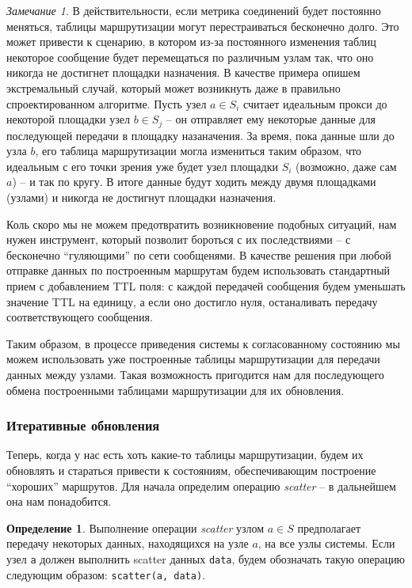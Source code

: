 \documentclass{article}
\theoremstyle{plain}
\theoremstyle{plain}
\theoremstyle{plain}
\theoremstyle{plain}
\theoremstyle{definition}
\newtheorem{definition}{Определение}[section]
\theoremstyle{remark}
\newtheorem{remark}{Замечание}[section]
\theoremstyle{plain}
\begin{document}
\begin{remark}
\label{InfinityLoops}
    В действительности, если метрика соединений будет постоянно меняться, таблицы маршрутизации могут перестраиваться бесконечно долго. Это может привести к сценарию, в котором из-за постоянного изменения таблиц некоторое сообщение будет перемещаться по различным узлам так, что оно никогда не достигнет площадки назначения. В качестве примера опишем экстремальный случай, который может возникнуть даже в правильно спроектированном алгоритме. Пусть узел $a \in S_i$ считает идеальным прокси до некоторой площадки узел $b \in S_j$ -- он отправляет ему некоторые данные для последующей передачи в площадку назаначения. За время, пока данные шли до узла $b$, его таблица маршрутизации могла измениться таким образом, что идеальным с его точки зрения уже будет узел площадки $S_i$ (возможно, даже сам $a$) -- и так по кругу. В итоге данные будут ходить между двумя площадками (узлами) и никогда не достигнут площадки назначения.
    
    Коль скоро мы не можем предотвратить возникновение подобных ситуаций, нам нужен инструмент, который позволит бороться с их последствиями -- с бесконечно \enquote{гуляющими} по сети сообщенями. В качестве решения при любой отправке данных по построенным маршрутам будем использовать стандартный \cite{wiki:Time_to_live} прием с добавлением TTL поля: с каждой передачей сообщения будем уменьшать значение TTL на единицу, а если оно достигло нуля, останаливать передачу соответствующего сообщения.
\end{remark}

Таким образом, в процессе приведения системы к согласованному состоянию мы можем использовать уже построенные таблицы маршрутизации для передачи данных между узлами. Такая возможность пригодится нам для последующего обмена построенными таблицами маршрутизации для их обновления.

\subsubsection{Итеративные обновления}
\label{IterativeUpdates}

Теперь, когда у нас есть хоть какие-то таблицы маршрутизации, будем их обновлять и стараться привести к состояниям, обеспечивающим построение \enquote{хороших} маршрутов. Для начала определим операцию \textit{scatter} -- в дальнейшем она нам понадобится.

\begin{definition}
\label{ScatterDefinition}
    Выполнение операции \textit{scatter} узлом $a \in S$ предполагает передачу некоторых данных, находящихся на узле $a$, на все узлы системы. Если узел \texttt{a} должен выполнить scatter данных \texttt{data}, будем обозначать такую операцию следующим образом: \texttt{scatter(a, data)}.
\end{definition}
\end{document}
